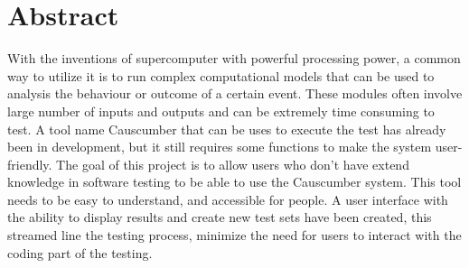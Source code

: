 \chapter*{\Large \center Abstract}

With the inventions of supercomputer with powerful processing power, a common way to utilize it is to run complex computational models that can be used to analysis the behaviour or outcome of a certain event. These modules often involve large number of inputs and outputs and can be extremely time consuming to test. A tool name Causcumber that can be uses to execute the test has already been in development, but it still requires some functions to make the system user-friendly. The goal of this project is to allow users who don’t have extend knowledge in software testing to be able to use the Causcumber system. This tool needs to be easy to understand, and accessible for people.
A user interface with the ability to display results and create new
test sets have been created, this streamed line the testing process, minimize the need for users to interact with the coding part of the testing.


